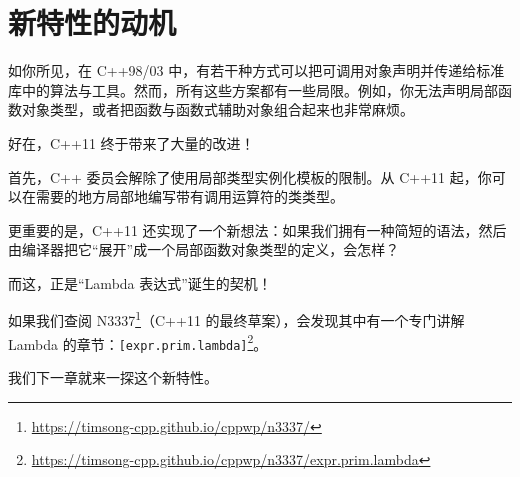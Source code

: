 \section{新特性的动机}

如你所见，在 C++98/03 中，有若干种方式可以把可调用对象声明并传递给标准库中的算法与工具。然而，所有这些方案都有一些局限。例如，你无法声明局部函数对象类型，或者把函数与函数式辅助对象组合起来也非常麻烦。

好在，C++11 终于带来了大量的改进！

首先，C++ 委员会解除了使用局部类型实例化模板的限制。从 C++11 起，你可以在需要的地方局部地编写带有调用运算符的类类型。

更重要的是，C++11 还实现了一个新想法：如果我们拥有一种简短的语法，然后由编译器把它“展开”成一个局部函数对象类型的定义，会怎样？

而这，正是“Lambda 表达式”诞生的契机！

如果我们查阅 N3337\footnote{\url{https://timsong-cpp.github.io/cppwp/n3337/}}（C++11 的最终草案），会发现其中有一个专门讲解 Lambda 的章节：\texttt{[expr.prim.lambda]}\footnote{\url{https://timsong-cpp.github.io/cppwp/n3337/expr.prim.lambda}}。

我们下一章就来一探这个新特性。
